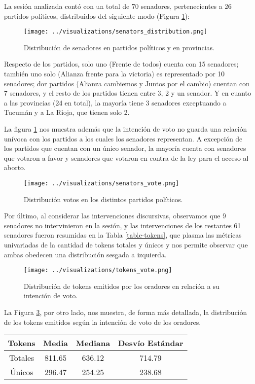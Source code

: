 La sesión analizada contó con un total de 70 senadores,
pertenecientes a 26 partidos políticos, distribuidos del
siguiente modo (Figura \ref{fig-distrib-senators}):

\begin{figure}[h!]
\centering
\texttt{[image: ../visualizations/senators\_distribution.png]}
\caption{Distribución de senadores en partidos políticos y en provincias.}
\label{fig-distrib-senators}
\end{figure}

Respecto de los partidos, solo uno (Frente de todos) cuenta con 15
senadores; también uno solo (Alianza frente para la victoria) es
representado por 10 senadores; dor partidos (Alianza cambiemos y
Juntos por el cambio) cuentan con 7 senadores, y el resto de los
partidos tienen entre 3, 2 y un senador. Y en cuanto a las provincias
(24 en total), la mayoría tiene 3 senadores exceptuando a Tucumán y
a La Rioja, que tienen solo 2.

La figura \ref{fig-distrib-senators} nos muestra además que la intención
de voto no guarda una relación unívoca con los partidos a los cuales los
senadores representan. A excepción de los partidos que cuentan con un único
senador, la mayoría cuenta con senadores que votaron a favor y senadores
que votaron en contra de la ley para el acceso al aborto.

\begin{figure}[h!]
\centering
\texttt{[image: ../visualizations/senators\_vote.png]}
\caption{Distribución votos en los distintos partidos políticos.}
\label{fig-distrib-vote}
\end{figure}

Por último, al considerar las intervenciones discursivas, observamos que
9 senadores no intervinieron en la sesión, y las intervenciones de los
restantes 61 senadores fueron resumidas en la Tabla \ref{table-tokens}, que plasma
las métricas univariadas de la cantidad de tokens totales y únicos y nos
permite observar que ambas obedecen una distribución sesgada a izquierda.

\begin{figure}[h!]
\centering
\texttt{[image: ../visualizations/tokens\_vote.png]}
\caption{Distribución de tokens emitidos por los oradores en relación a
su intención de voto.}
\label{fig-distrib-tokens-vote}
\end{figure}

La Figura \ref{fig-distrib-tokens-vote}, por otro lado, nos muestra,
de forma más detallada, la distribución de los tokens emitidos según
la intención de voto de los oradores.

\begin{center}
\begin{tabular}{ |c|c|c|c| }
\hline
Tokens & Media & Mediana & Desvío Estándar \\
\hline\hline
Totales & 811.65 & 636.12 & 714.79 \\
\hline
Únicos & 296.47 & 254.25 & 238.68 \\
\hline
\end{tabular}
\label{table-tokens}
\end{center}
